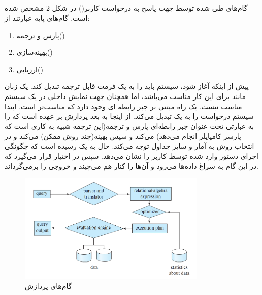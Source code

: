 \documentclass{article}
\begin{document}
\subsection{}
گام‌های طی شده توسط
جهت پاسخ به درخواست کاربر() در شکل 2 مشخص شده است.
گام‌های پایه عبارتند از:
\newline
\begin{enumerate}
    \item
پارس و ترجمه()
    \item
بهینه‌سازی()
	\item
ارزیابی()
\end{enumerate}
پیش از اینکه
آغاز شود، سیستم باید
را به یک فرمت قابل ترجمه تبدیل کند. یک زبان مانند
برای این کار مناسب می‌باشد، اما همچنان جهت نمایش داخلی
در یک سیستم مناسب نیست. یک راه مبتنی بر جبر رابطه ای وجود دارد که مناسب‌تر است.
\newline
ابتدا سیستم درخواست را به یک
تبدیل می‌کند. از اینجا به بعد پردازش بر عهده
است که
را به عبارتی تحت عنوان جبر رابطه‌ای پارس و ترجمه(این ترجمه شبیه به کاری است که پارسر کامپایلر انجام می‌دهد) می‌کند و سپس بهینه(چند روش ممکن) می‌کند و در انتخاب روش به آمار و سایز جداول توجه می‌کند. حال
به یک
رسیده است که چگونگی اجرای دستور وارد شده توسط کاربر را نشان می‌دهد. سپس در اختیار
قرار می‌گیرد که در این گام به سراغ داده‌ها می‌رود و آن‌ها را کنار هم می‌چیند و خروجی را برمی‌گرداند.

\begin{figure}[ht]
    \centering
    \includegraphics[width=0.8\textwidth]{figures/1.2.png}
    \caption
	{
گام‌های پردازش
	}
    \label{fig:fig1}
\end{figure}
\FloatBarrier
\end{document}

